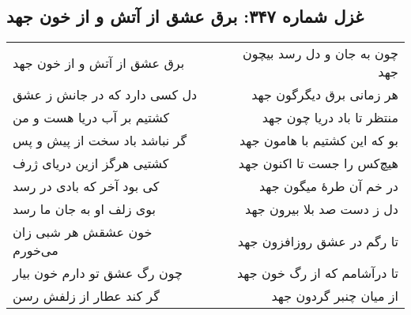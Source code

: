 \begin{center}
\section*{غزل شماره ۳۴۷: برق عشق از آتش و از خون جهد}
\label{sec:347}
\begin{longtable}{l p{0.5cm} r}
برق عشق از آتش و از خون جهد
&&
چون به جان و دل رسد بیچون جهد
\\
دل کسی دارد که در جانش ز عشق
&&
هر زمانی برق دیگرگون جهد
\\
کشتیم بر آب دریا هست و من
&&
منتظر تا باد دریا چون جهد
\\
گر نباشد باد سخت از پیش و پس
&&
بو که این کشتیم با هامون جهد
\\
کشتیی هرگز ازین دریای ژرف
&&
هیچ‌کس را جست تا اکنون جهد
\\
کی بود آخر که بادی در رسد
&&
در خم آن طرهٔ میگون جهد
\\
بوی زلف او به جان ما رسد
&&
دل ز دست صد بلا بیرون جهد
\\
خون عشقش هر شبی زان می‌خورم
&&
تا رگم در عشق روزافزون جهد
\\
چون رگ عشق تو دارم خون بیار
&&
تا درآشامم که از رگ خون جهد
\\
گر کند عطار از زلفش رسن
&&
از میان چنبر گردون جهد
\\
\end{longtable}
\end{center}
